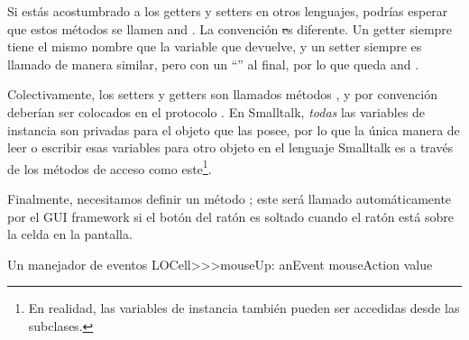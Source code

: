 \documentclass[a4paper,10pt,twoside]{book}
\begin{document}
{%
Si est\'as acostumbrado a los getters y setters en otros lenguajes, podr\'ias esperar que estos m\'etodos se  llamen  and .
La convenci\'on \st es diferente. 
Un getter siempre tiene el mismo nombre que la variable que devuelve, y un setter siempre es llamado de manera similar, pero con un ``\ct{:}'' al final, por lo que queda  and .

Colectivamente, los setters y getters son llamados m\'etodos , y por convenci\'on deber\'ian ser colocados en el protocolo .
En Smalltalk, \emph{todas} las variables de instancia son privadas para el objeto que las posee, por lo que la \'unica manera de leer o escribir esas variables para otro objeto en el lenguaje Smalltalk es a trav\'es de los m\'etodos de acceso como este\footnote{En realidad, las variables de instancia tambi\'en pueden ser accedidas desde las subclases.}.


Finalmente, necesitamos definir un m\'etodo ; este ser\'a llamado autom\'aticamente por el GUI framework  si el bot\'on del rat\'on es soltado cuando el rat\'on est\'a sobre la celda en la pantalla.

\begin{method}[sbecellmouseup]{Un manejador de eventos}
LOCell>>>mouseUp: anEvent
   mouseAction value
\end{method}

}
\end{document}
